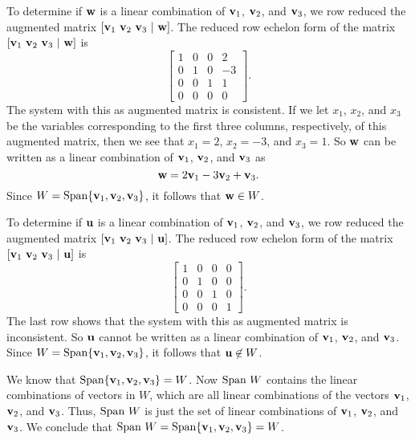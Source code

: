 \begin{example}
\item To determine if $\mathbf{w}$ is a linear combination of $\mathbf{v}_1$, $\mathbf{v}_2$, and $\mathbf{v}_3$, we row reduced the augmented matrix $[\mathbf{v}_1 \ \mathbf{v}_2 \ \mathbf{v}_3 \ | \ \mathbf{w}]$. The reduced row echelon form of the matrix $[\mathbf{v}_1 \ \mathbf{v}_2 \ \mathbf{v}_3 \ | \ \mathbf{w}]$ is
\[\left[ \begin{array}{ccc|r} 1&0&0&2 \\ 0&1&0&-3\\ 0&0&1&1 \\ 0&0&0&0 \end{array}\right].\]
The system with this as augmented matrix is consistent. If we let $x_1$, $x_2$, and $x_3$ be the variables corresponding to the first three columns, respectively, of this augmented matrix, then we see that $x_1 = 2$, $x_2 = -3$, and $x_3 = 1$. So $\mathbf{w}$ can be written as a linear combination of $\mathbf{v}_1$, $\mathbf{v}_2$, and $\mathbf{v}_3$ as 
\[\mathbf{w} = 2\mathbf{v}_1 -3\mathbf{v}_2 + \mathbf{v}_3.\]
Since $W = \text{Span}\{\mathbf{v}_1, \mathbf{v}_2, \mathbf{v}_3\}$, it follows that $\mathbf{w} \in W$. 

\item To determine if $\mathbf{u}$ is a linear combination of $\mathbf{v}_1$, $\mathbf{v}_2$, and $\mathbf{v}_3$, we row reduced the augmented matrix $[\mathbf{v}_1 \ \mathbf{v}_2 \ \mathbf{v}_3 \ | \ \mathbf{u}]$. The reduced row echelon form of the matrix $[\mathbf{v}_1 \ \mathbf{v}_2 \ \mathbf{v}_3 \ | \ \mathbf{u}]$ is
\[\left[ \begin{array}{ccc|c} 1&0&0&0 \\ 0&1&0&0\\ 0&0&1&0 \\ 0&0&0&1 \end{array}\right].\]
The last row shows that the system with this as augmented matrix is inconsistent. So $\mathbf{u}$ cannot be written as a linear combination of $\mathbf{v}_1$, $\mathbf{v}_2$, and $\mathbf{v}_3$. Since $W = \text{Span}\{\mathbf{v}_1, \mathbf{v}_2, \mathbf{v}_3\}$, it follows that $\mathbf{u} \not\in W$. 

\item We know that $\text{Span}\{\mathbf{v}_1, \mathbf{v}_2, \mathbf{v}_3\} = W$. Now $\text{Span} \ W$ contains the linear combinations of vectors in $W$, which are all linear combinations of the vectors $\mathbf{v}_1$, $\mathbf{v}_2$, and $\mathbf{v}_3$. Thus, $\text{Span} \ W$ is just the set of linear combinations of $\mathbf{v}_1$, $\mathbf{v}_2$, and $\mathbf{v}_3$. We conclude that  $\text{Span} \ W = \text{Span}\{\mathbf{v}_1, \mathbf{v}_2, \mathbf{v}_3\} = W$. 

\ea

\end{example}

\label{sec:vec_rep_summ}

